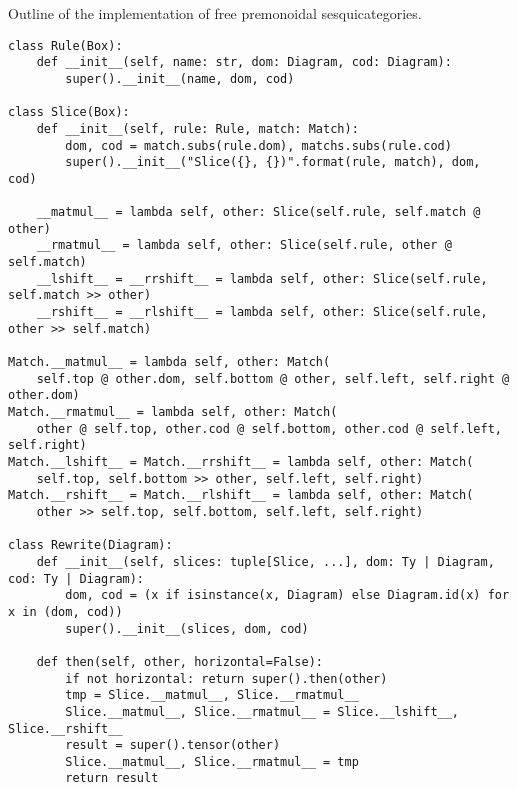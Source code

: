 \begin{python}\label{listing:free-monoidal-2-category}
{\normalfont Outline of the implementation of free premonoidal sesquicategories.}

\begin{verbatim}
class Rule(Box):
    def __init__(self, name: str, dom: Diagram, cod: Diagram):
        super().__init__(name, dom, cod)

class Slice(Box):
    def __init__(self, rule: Rule, match: Match):
        dom, cod = match.subs(rule.dom), matchs.subs(rule.cod)
        super().__init__("Slice({}, {})".format(rule, match), dom, cod)

    __matmul__ = lambda self, other: Slice(self.rule, self.match @ other)
    __rmatmul__ = lambda self, other: Slice(self.rule, other @ self.match)
    __lshift__ = __rrshift__ = lambda self, other: Slice(self.rule, self.match >> other)
    __rshift__ = __rlshift__ = lambda self, other: Slice(self.rule, other >> self.match)

Match.__matmul__ = lambda self, other: Match(
    self.top @ other.dom, self.bottom @ other, self.left, self.right @ other.dom)
Match.__rmatmul__ = lambda self, other: Match(
    other @ self.top, other.cod @ self.bottom, other.cod @ self.left, self.right)
Match.__lshift__ = Match.__rrshift__ = lambda self, other: Match(
    self.top, self.bottom >> other, self.left, self.right)
Match.__rshift__ = Match.__rlshift__ = lambda self, other: Match(
    other >> self.top, self.bottom, self.left, self.right)

class Rewrite(Diagram):
    def __init__(self, slices: tuple[Slice, ...], dom: Ty | Diagram, cod: Ty | Diagram):
        dom, cod = (x if isinstance(x, Diagram) else Diagram.id(x) for x in (dom, cod))
        super().__init__(slices, dom, cod)

    def then(self, other, horizontal=False):
        if not horizontal: return super().then(other)
        tmp = Slice.__matmul__, Slice.__rmatmul__
        Slice.__matmul__, Slice.__rmatmul__ = Slice.__lshift__, Slice.__rshift__
        result = super().tensor(other)
        Slice.__matmul__, Slice.__rmatmul__ = tmp
        return result
\end{verbatim}
\end{python}

